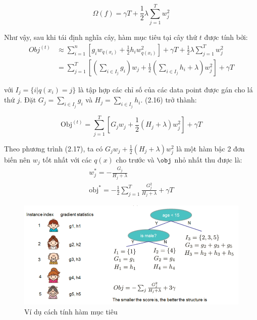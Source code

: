 \begin{equation}
    \Omega(f) = \gamma T + \frac{1}{2}\lambda \sum_{j=1}^T w_j^2
\end{equation}

Như vậy, sau khi tái định nghĩa cây, hàm mục tiêu tại cây thứ $t$ được tính bởi: 
\begin{equation}
    \begin{split}Obj^{(t)} &\approx \sum_{i=1}^n [g_i w_{q(x_i)} + \frac{1}{2} h_i w_{q(x_i)}^2] + \gamma T + \frac{1}{2}\lambda \sum_{j=1}^T w_j^2\\
&= \sum^T_{j=1} [(\sum_{i\in I_j} g_i) w_j + \frac{1}{2} (\sum_{i\in I_j} h_i + \lambda) w_j^2 ] + \gamma T
\end{split}
\end{equation}

với $I_j = \{i|q(x_i)=j\}$ là tập hợp các chỉ số của các data point được gán cho lá thứ $j$. Đặt $G_j = \sum_{i\in I_j} g_i$ và $H_j = \sum_{i\in I_j} h_i$. (2.16) trở thành:

\begin{equation}
    \text{Obj}^{(t)} = \sum^T_{j=1} [G_jw_j + \frac{1}{2} (H_j+\lambda) w_j^2] +\gamma T
\end{equation}


Theo phương trình (2.17), ta có $G_jw_j+\frac{1}{2}(H_j+\lambda)w_j^2$ là một hàm bậc 2 đơn biến nên $w_j$ tốt nhất với các $q(x)$ cho trước và $\obj$ nhỏ nhất thu được là:
\begin{equation}
    \begin{split}w_j^\ast = -\frac{G_j}{H_j+\lambda}\\
\text{obj}^\ast = -\frac{1}{2} \sum_{j=1}^T \frac{G_j^2}{H_j+\lambda} + \gamma T
\end{split}
\end{equation}

\begin{figure}[H]
    \centering
    \includegraphics[scale=0.8]{Chapter2/Figs/objective-example.PNG}
    \caption{Ví dụ cách tính hàm mục tiêu}
    \label{fig:my_label3}
\end{figure}


